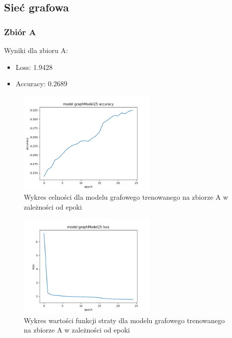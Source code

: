 \documentclass{article}
\begin{document}
\subsection{Sieć grafowa}

\subsubsection{Zbiór A}

Wyniki dla zbioru A:
\begin{itemize}
    \item Loss: 1.9428
    \item Accuracy: 0.2689
\end{itemize}

\begin{figure}[H]
    \centering
    \includegraphics[width=0.6\textwidth]{img/graphModel25_acc.png}
    \caption{Wykres celności dla modelu grafowego trenowanego na zbiorze A w zależności od epoki} 
\end{figure}

\begin{figure}[H]
    \centering
    \includegraphics[width=0.6\textwidth]{img/graphModel25_loss.png}
    \caption{Wykres wartości funkcji straty dla modelu grafowego trenowanego na zbiorze A w zależności od epoki} 
\end{figure}
\end{document}
